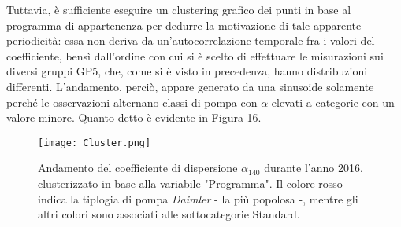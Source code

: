 \documentclass[fleqn,10pt]{SelfArx} %
\begin{document}
Tuttavia, è sufficiente eseguire un clustering grafico dei punti in base al programma di appartenenza per dedurre la motivazione di tale apparente periodicità: essa non deriva da un'autocorrelazione temporale fra i valori del coefficiente, bensì dall'ordine con cui si è scelto di effettuare le misurazioni sui diversi gruppi GP5, che, come si è visto in precedenza, hanno distribuzioni differenti. L'andamento, perciò, appare generato da una sinusoide solamente perché le osservazioni alternano classi di pompa con $\alpha$ elevati a categorie con un valore minore. Quanto detto è evidente in Figura 16.
\begin{figure}[h]
    \centering
    \texttt{[image: Cluster.png]}
    \label{fig:em}
    \caption{Andamento del coefficiente di dispersione $\alpha_{140}$ durante l'anno 2016, clusterizzato in base alla variabile "Programma". Il colore rosso indica la tiplogia di pompa \textit{Daimler} - la più popolosa -, mentre gli altri colori sono associati alle sottocategorie Standard.}
\end{figure}
\end{document}
